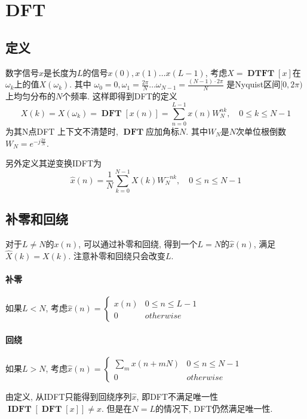 \documentclass{ctexart}
\DeclareMathOperator{\DTFT}{\mathbf{DTFT}}
\DeclareMathOperator{\DFT}{\mathbf{DFT}}
\DeclareMathOperator{\IDFT}{\mathbf{IDFT}}
\begin{document}
\section{DFT}
%
%
%
%
%
%
%
%
%
%
%


\subsection{定义}
    数字信号$x$是长度为$L$的信号$x(0), x(1) \ldots x(L - 1)$,
    考虑$X = \DTFT[x]$在$\omega_k$上的值$X(\omega_k)$. 其中
    $\omega_0 = 0, \omega_1 = \frac{2\pi}{N} \ldots \omega_{N - 1} = \frac{(N-1) \cdot 2\pi}{N}$
    是Nyquist区间$[0, 2\pi)$上均匀分布的$N$个频率. 这样即得到DFT的定义
    \[
        X(k) = X(\omega_k) = \DFT[x(n)] = \sum_{n = 0}^{L - 1} x(n) W_N^{nk},\quad 0 \le k \le N - 1\]
    为其N点DFT
    上下文不清楚时, $\DFT$应加角标$N$. 其中$W_N$是$N$次单位根倒数$W_N = e^{- j \frac{2 \pi}{N}}$.\par
    另外定义其逆变换IDFT为\[
        \hat{x}(n) = \frac{1}{N} \sum_{k = 0}^{N - 1} X(k) W_N^{-nk},\quad 0 \le n  \le N -1 \]

\subsection{补零和回绕} 对于$L \neq N$的$x(n)$, 可以通过补零和回绕, 得到一个$L = N$的$\hat{x}(n)$, 满足$\hat{X}(k) = X(k)$.
    注意补零和回绕只会改变$L$.
\paragraph{补零} 如果$L < N$, 考虑$\hat{x}(n) = \begin{cases} x(n) & 0 \le n \le L - 1\\ 0 & otherwise \end{cases}$
\paragraph{回绕} 如果$L > N$, 考虑$\hat{x}(n) = \begin{cases} \sum_m x(n + mN) & 0 \le n \le N - 1 \\ 0 & otherwise \end{cases}$\par
    由定义, 从IDFT只能得到回绕序列$\hat{x}$, 即DFT不满足唯一性 $\IDFT[\DFT [x]] \neq x$. 但是在$N = L$的情况下, DFT仍然满足唯一性.
\end{document}
